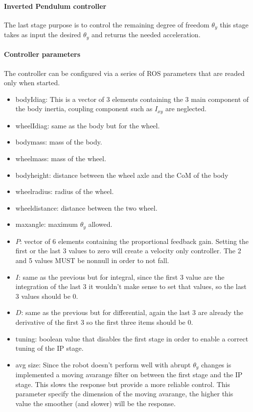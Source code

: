 \documentclass[a4paper, 7px]{article}
\begin{document}
\paragraph{Inverted Pendulum controller}
The last stage purpose is to control the remaining degree of freedom $\theta_y$ this stage takes as input the desired $\theta_y$ and returns the needed acceleration.

\paragraph{Controller parameters}
The controller can be configured via a series of ROS parameters that are readed only when started.
\begin{itemize}
	\item body\textunderscore I\textunderscore diag: This is a vector of 3 elements containing the 3 main component of the body inertia, coupling component such as $I_{xy}$ are neglected.
	\item wheel\textunderscore I\textunderscore diag: same as the body but for the wheel.
	\item body\textunderscore mass: mass of the body.
    \item wheel\textunderscore mass: mass of the wheel.
    \item body\textunderscore height: distance between the wheel axle and the CoM of the body
    \item wheel\textunderscore radius: radius of the wheel.
    \item wheel\textunderscore distance: distance between the two wheel. 
    \item max\textunderscore angle: maximum $\theta_y$ allowed.
    \item $P$: vector of 6 elements containing the proportional feedback gain. Setting the first or the last 3 values to zero will create a velocity only controller. The 2 and 5 values MUST be nonnull in order to not fall.
    \item $I$: same as the previous but for integral, since the first 3 value are the integration of the last 3 it wouldn't make sense to set that values, so the last 3 values should be 0.
    \item $D$: same as the previous but for differential, again the last 3 are already the derivative of the first 3 so the first three items should be 0.
    \item tuning: boolean value that disables the first stage in order to enable a correct tuning of the IP stage.
    \item avg \textunderscore size: Since the robot doesn't perform well with abrupt $\theta_y$ changes is implemented a moving avarange filter on between the first stage and the IP stage. This slows the response but provide a more reliable control. This parameter specify the dimension of the moving avarange, the higher this value the smoother (and slower) will be the response.
   
\end{itemize}
\end{document}
